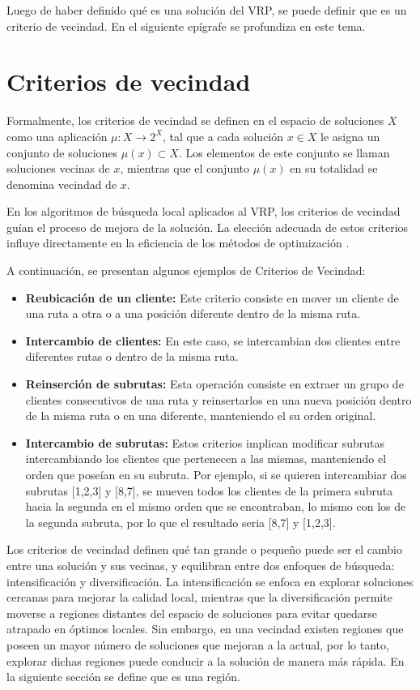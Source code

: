 \documentclass[12pt]{report}
\begin{document}
	Luego de haber definido qué es una solución del VRP, se puede definir que es un criterio de vecindad. En el siguiente epígrafe se profundiza en este tema.


	\section{Criterios de vecindad}
	\label{sec:Criterios de vecindad}
    Formalmente, los criterios de vecindad se definen en el espacio de soluciones $X$ como una aplicación $\mu:X \rightarrow 2^X$, tal que a cada solución $x \in X$ le asigna un conjunto de soluciones $\mu(x) \subset X$. Los elementos de este conjunto se llaman soluciones vecinas de $x$, mientras que el conjunto $\mu(x)$ en su totalidad se denomina vecindad de $x$.

	En los algoritmos de búsqueda local aplicados al VRP, los criterios de vecindad guían el proceso de mejora de la solución. La elección adecuada de estos criterios influye directamente en la eficiencia de los métodos de optimización \cite{ref13}.

	A continuación, se presentan algunos ejemplos de Criterios de Vecindad:
	\begin{itemize}
		\item
		\textbf{Reubicación de un cliente:}
		Este criterio consiste en mover un cliente de una ruta a otra o a una posición diferente dentro de la misma ruta.
		\item
		\textbf{Intercambio de clientes:}
		En este caso, se intercambian dos clientes entre diferentes rutas o dentro de la misma ruta.
		\item
		\textbf{Reinserción de subrutas:}
		Esta operación consiste en extraer un grupo de clientes consecutivos de una ruta y reinsertarlos en una nueva posición dentro de la misma ruta o en una diferente, manteniendo el su orden original.
		\item
		\textbf{Intercambio de subrutas:}
		Estos criterios implican modificar subrutas intercambiando los clientes que pertenecen a las mismas, manteniendo el orden que poseían en su subruta. Por ejemplo, si se quieren intercambiar dos subrutas [1,2,3] y [8,7], se mueven todos los clientes de la primera subruta hacia la segunda en el mismo orden que se encontraban, lo mismo con los de la segunda subruta, por lo que el resultado seria [8,7] y [1,2,3].
	\end{itemize}

	Los criterios de vecindad definen qué tan grande o pequeño puede ser el cambio entre una solución y sus vecinas, y equilibran entre dos enfoques de búsqueda: intensificación y diversificación. La intensificación se enfoca en explorar soluciones cercanas para mejorar la calidad local, mientras que la diversificación permite moverse a regiones distantes del espacio de soluciones para evitar quedarse atrapado en óptimos locales. Sin embargo, en una vecindad existen regiones que poseen un mayor número de soluciones que mejoran a la actual, por lo tanto, explorar dichas regiones puede conducir a la solución de manera más rápida. En la siguiente sección se define que es una región.
\end{document}
